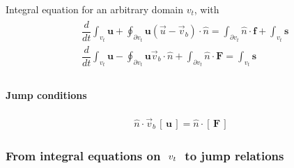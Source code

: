 \documentclass[letterpaper,10pt,english]{jupyterBook}
\begin{document}
\sphinxAtStartPar
Integral equation for an arbitrary domain \(v_t\), with {\hyperref[\detokenize{ch/tensor-algebra-calculus/time-derivative-of-integrals:tensor-calculus-time-derivative-of-integrals-volume-density}]{}}
\begin{equation*}
\begin{split}\begin{aligned}
  & \dfrac{d}{dt} \int_{v_t} \mathbf{u} + \oint_{\partial v_t} \mathbf{u} ( \vec{u} - \vec{v}_b ) \cdot \hat{n} = \int_{\partial v_t} \hat{n} \cdot \mathbf{f} + \int_{v_t} \mathbf{s} \\ 
  & \dfrac{d}{dt} \int_{v_t} \mathbf{u} - \oint_{\partial v_t} \mathbf{u} \vec{v}_b \cdot \hat{n} + \int_{\partial v_t} \hat{n} \cdot \mathbf{F} = \int_{v_t} \mathbf{s} \\ 
\end{aligned}\end{split}
\end{equation*}

\paragraph{Jump conditions}
\label{\detokenize{ch/pde/hyperbolic-nd-draft:jump-conditions}}\label{\detokenize{ch/pde/hyperbolic-nd-draft:pde-hyperbolic-nd-draft-integral-jump}}\begin{equation}\label{equation:ch/pde/hyperbolic-nd-draft:eq:pde:hyperbolic:jump}
\begin{split}
\hat{n} \cdot \vec{v}_b \, \left[ \, \mathbf{u} \, \right] = \hat{n} \cdot \left[ \, \mathbf{F} \, \right] 
\end{split}
\end{equation}\subsubsection*{From integral equations on \protect\(\ v_t \ \protect\) to jump relations}
\end{document}
